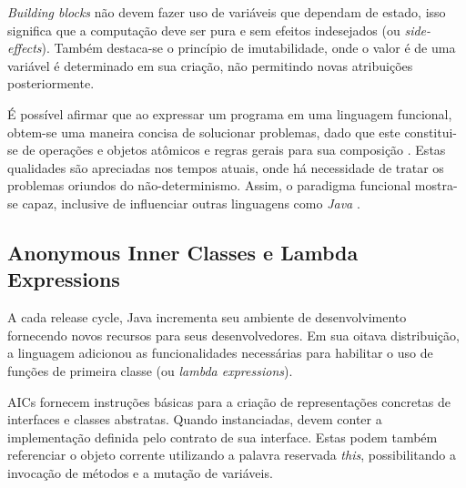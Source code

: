 \documentclass[10pt, conference]{IEEEtran}
\begin{document}
\textit{Building blocks} não devem fazer uso de variáveis que dependam de estado, isso significa que a computação deve ser pura e sem efeitos indesejados (ou \textit{side-effects}). Também destaca-se o princípio de imutabilidade, onde o valor é de uma variável é determinado em sua criação, não permitindo novas atribuições posteriormente.

É possível afirmar que ao expressar um programa em uma linguagem funcional, obtem-se uma maneira concisa de solucionar problemas, dado que este constitui-se de operações e objetos atômicos e regras gerais para sua composição \cite{michaelson2011introduction}. Estas qualidades são apreciadas nos tempos atuais, onde há necessidade de tratar os problemas oriundos do não-determinismo. Assim, o paradigma funcional mostra-se capaz, inclusive de influenciar outras linguagens como \textit{Java} \cite{jsr335}.

\subsection{Anonymous Inner Classes e Lambda Expressions}
A cada release cycle, Java incrementa seu ambiente de desenvolvimento fornecendo novos recursos para seus desenvolvedores. Em sua oitava distribuição, a linguagem adicionou as funcionalidades necessárias para habilitar o uso de funções de primeira classe (ou \textit{lambda expressions}). 

AICs fornecem instruções básicas para a criação de representações concretas de interfaces e classes abstratas. Quando instanciadas, devem conter a implementação definida pelo contrato de sua interface. Estas podem também referenciar o objeto corrente utilizando a palavra reservada \textit{this}, possibilitando a invocação de métodos e a mutação de variáveis.



\end{document}
